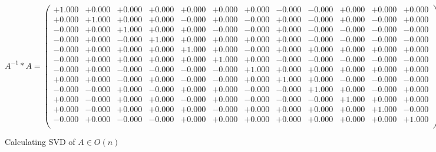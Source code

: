 \documentclass[9pt]{article}
\theoremstyle{plain}
\theoremstyle{definition}
\theoremstyle{remark}
\numberwithin{equation}{section}
\begin{document}
$A^{-1} *A = \left(
\begin{array}{
cccccccccccc}
+1.000 & +0.000 & +0.000 & +0.000 & +0.000 & +0.000 & +0.000 & -0.000 & -0.000 & +0.000 & +0.000 & +0.000 \\
+0.000 & +1.000 & +0.000 & +0.000 & -0.000 & +0.000 & -0.000 & +0.000 & -0.000 & +0.000 & -0.000 & +0.000 \\
-0.000 & +0.000 & +1.000 & +0.000 & +0.000 & -0.000 & -0.000 & +0.000 & -0.000 & -0.000 & -0.000 & -0.000 \\
-0.000 & +0.000 & -0.000 & +1.000 & +0.000 & +0.000 & +0.000 & +0.000 & -0.000 & -0.000 & -0.000 & -0.000 \\
-0.000 & +0.000 & +0.000 & +0.000 & +1.000 & +0.000 & -0.000 & +0.000 & +0.000 & +0.000 & +0.000 & +0.000 \\
-0.000 & +0.000 & +0.000 & +0.000 & +0.000 & +1.000 & +0.000 & -0.000 & -0.000 & -0.000 & -0.000 & -0.000 \\
-0.000 & +0.000 & -0.000 & -0.000 & -0.000 & -0.000 & +1.000 & +0.000 & +0.000 & +0.000 & +0.000 & +0.000 \\
+0.000 & +0.000 & -0.000 & +0.000 & -0.000 & -0.000 & +0.000 & +1.000 & +0.000 & -0.000 & -0.000 & -0.000 \\
-0.000 & -0.000 & +0.000 & -0.000 & +0.000 & +0.000 & -0.000 & -0.000 & +1.000 & +0.000 & -0.000 & +0.000 \\
+0.000 & -0.000 & +0.000 & +0.000 & -0.000 & +0.000 & -0.000 & -0.000 & -0.000 & +1.000 & +0.000 & +0.000 \\
+0.000 & -0.000 & +0.000 & +0.000 & +0.000 & -0.000 & +0.000 & +0.000 & +0.000 & +0.000 & +1.000 & -0.000 \\
-0.000 & +0.000 & -0.000 & -0.000 & +0.000 & +0.000 & +0.000 & +0.000 & +0.000 & +0.000 & +0.000 & +1.000 \\
\end{array}
\right)$ \newline 

Calculating SVD of  $A \in O(n)$
\end{document}
